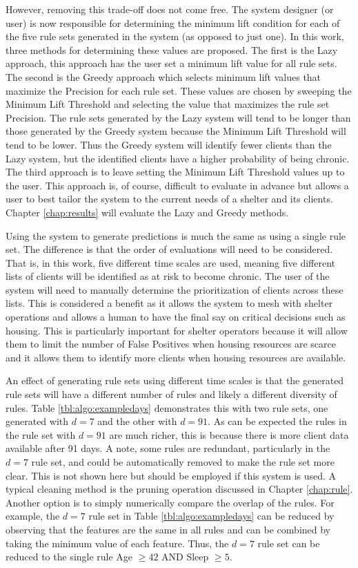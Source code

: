 However, removing this trade-off does not come free. The system designer (or user) is now responsible for determining the minimum lift condition for each of the five rule sets generated in the \Abb system (as opposed to just one). In this work, three methods for determining these values are proposed. The first is the Lazy approach, this approach has the user set a minimum lift value for all rule sets. The second is the Greedy approach which selects minimum lift values that maximize the Precision for each rule set. These values are chosen by sweeping the Minimum Lift Threshold and selecting the value that maximizes the rule set Precision.
The rule sets generated by the Lazy system will tend to be longer than those generated by the Greedy system because the Minimum Lift Threshold will tend to be lower.
Thus the Greedy system will identify fewer clients than the Lazy system, but the identified clients have a higher probability of being chronic. The third approach is to leave setting the Minimum Lift Threshold values up to the user. This approach is, of course, difficult to evaluate in advance but allows a user to best tailor the system to the current needs of a shelter and its clients. Chapter \ref{chap:results} will evaluate the Lazy and Greedy methods.


Using the \Abb system to generate predictions is much the same as using a single rule set. The difference is that the order of evaluations will need to be considered. That is, in this work, five different time scales are used, meaning five different lists of clients will be identified as at risk to become chronic. The user of the system will need to manually determine the prioritization of clients across these lists. This is considered a benefit as it allows the system to mesh with shelter operations and allows a human to have the final say on critical decisions such as housing. This is particularly important for shelter operators because it will allow them to limit the number of False Positives when housing resources are scarce and it allows them to identify more clients when housing resources are available.

An effect of generating rule sets using different time scales is that the generated rule sets will have a different number of rules and likely a different diversity of rules. Table \ref{tbl:algo:exampledays} demonstrates this with two rule sets, one generated with $d=7$ and the other with $d=91$. As can be expected the rules in the rule set with $d=91$ are much richer, this is because there is more client data available after 91 days. A note, some rules are redundant, particularly in the $d=7$ rule set, and could be automatically removed to make the rule set more clear. This is not shown here but should be employed if this system is used. A typical cleaning method is the pruning operation discussed in Chapter \ref{chap:rule}. Another option is to simply numerically compare the overlap of the rules. For example, the $d=7$ rule set in Table \ref{tbl:algo:exampledays} can be reduced by observing that the features are the same in all rules and can be combined by taking the minimum value of each feature. Thus, the $d=7$ rule set can be reduced to the single rule Age $\geq 42$ AND Sleep $\geq 5$.

